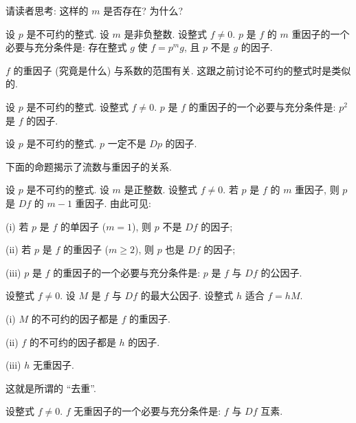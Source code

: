 \begin{remark}
    请读者思考: 这样的 $m$ 是否存在? 为什么?
\end{remark}

\begin{proposition}
    设 $p$ 是不可约的整式. 设 $m$ 是非负整数. 设整式 $f \neq 0$. $p$ 是 $f$ 的 $m$ 重因子的一个必要与充分条件是: 存在整式 $g$ 使 $f = p^m g$, 且 $p$ 不是 $g$ 的因子.
\end{proposition}

\begin{remark}
    $f$ 的重因子 (究竟是什么) 与系数的范围有关. 这跟之前讨论不可约的整式时是类似的.
\end{remark}

\begin{proposition}
    设 $p$ 是不可约的整式. 设整式 $f \neq 0$. $p$ 是 $f$ 的重因子的一个必要与充分条件是: $p^2$ 是 $f$ 的因子.
\end{proposition}

\begin{proposition}
    设 $p$ 是不可约的整式. $p$ 一定不是 $Dp$ 的因子.
\end{proposition}

下面的命题揭示了流数与重因子的关系.

\begin{proposition}
    设 $p$ 是不可约的整式. 设 $m$ 是正整数. 设整式 $f \neq 0$. 若 $p$ 是 $f$ 的 $m$ 重因子, 则 $p$ 是 $Df$ 的 $m-1$ 重因子. 由此可见:

    (i) 若 $p$ 是 $f$ 的单因子 ($m = 1$), 则 $p$ 不是 $Df$ 的因子;

    (ii) 若 $p$ 是 $f$ 的重因子 ($m \geq 2$), 则 $p$ 也是 $Df$ 的因子;

    (iii) $p$ 是 $f$ 的重因子的一个必要与充分条件是: $p$ 是 $f$ 与 $Df$ 的公因子.
\end{proposition}

\begin{proposition}
    设整式 $f \neq 0$. 设 $M$ 是 $f$ 与 $Df$ 的最大公因子. 设整式 $h$ 适合 $f = hM$.

    (i) $M$ 的不可约的因子都是 $f$ 的重因子.

    (ii) $f$ 的不可约的因子都是 $h$ 的因子.

    (iii) $h$ 无重因子.

    这就是所谓的 ``去重''.
\end{proposition}

\begin{proposition}
    设整式 $f \neq 0$. $f$ 无重因子的一个必要与充分条件是: $f$ 与 $Df$ 互素.
\end{proposition}

